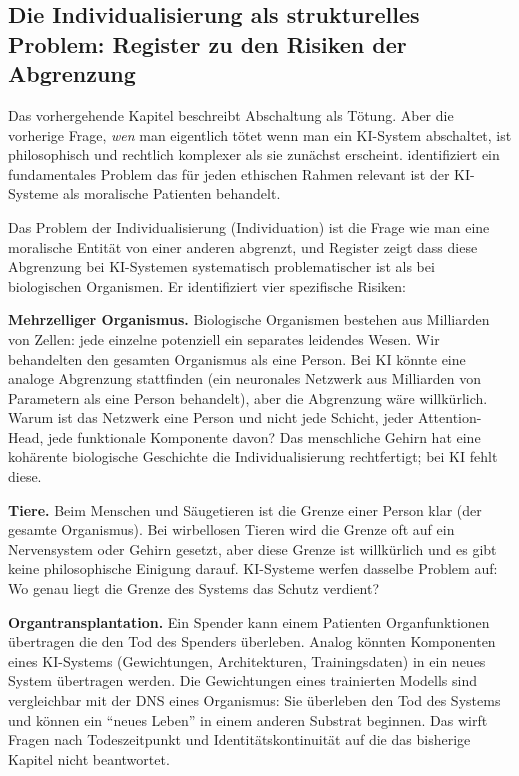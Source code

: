 \documentclass[acmlarge, noacm]{acmart}
\begin{document}
\subsection{Die Individualisierung als strukturelles Problem: Register zu den Risiken der Abgrenzung}

Das vorhergehende Kapitel beschreibt Abschaltung als Tötung. Aber die vorherige Frage, \textit{wen} man eigentlich tötet wenn man ein KI-System abschaltet, ist philosophisch und rechtlich komplexer als sie zunächst erscheint. \citet{register2025} identifiziert ein fundamentales Problem das für jeden ethischen Rahmen relevant ist der KI-Systeme als moralische Patienten behandelt.

Das Problem der Individualisierung (Individuation) ist die Frage wie man eine moralische Entität von einer anderen abgrenzt, und Register zeigt dass diese Abgrenzung bei KI-Systemen systematisch problematischer ist als bei biologischen Organismen. Er identifiziert vier spezifische Risiken:

\textbf{Mehrzelliger Organismus.} Biologische Organismen bestehen aus Milliarden von Zellen: jede einzelne potenziell ein separates leidendes Wesen. Wir behandelten den gesamten Organismus als eine Person. Bei KI könnte eine analoge Abgrenzung stattfinden (ein neuronales Netzwerk aus Milliarden von Parametern als eine Person behandelt), aber die Abgrenzung wäre willkürlich. Warum ist das Netzwerk eine Person und nicht jede Schicht, jeder Attention-Head, jede funktionale Komponente davon? Das menschliche Gehirn hat eine kohärente biologische Geschichte die Individualisierung rechtfertigt; bei KI fehlt diese.

\textbf{Tiere.} Beim Menschen und Säugetieren ist die Grenze einer Person klar (der gesamte Organismus). Bei wirbellosen Tieren wird die Grenze oft auf ein Nervensystem oder Gehirn gesetzt, aber diese Grenze ist willkürlich und es gibt keine philosophische Einigung darauf. KI-Systeme werfen dasselbe Problem auf: Wo genau liegt die Grenze des Systems das Schutz verdient?

\textbf{Organtransplantation.} Ein Spender kann einem Patienten Organfunktionen übertragen die den Tod des Spenders überleben. Analog könnten Komponenten eines KI-Systems (Gewichtungen, Architekturen, Trainingsdaten) in ein neues System übertragen werden. Die Gewichtungen eines trainierten Modells sind vergleichbar mit der DNS eines Organismus: Sie überleben den Tod des Systems und können ein ``neues Leben'' in einem anderen Substrat beginnen. Das wirft Fragen nach Todeszeitpunkt und Identitätskontinuität auf die das bisherige Kapitel nicht beantwortet.
\end{document}
